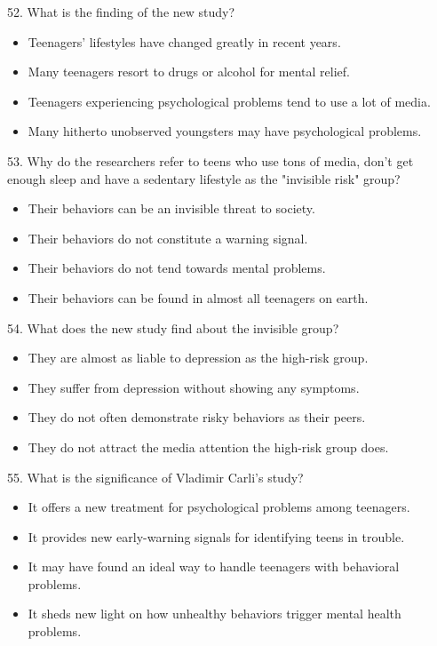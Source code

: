 \documentclass[UTF8,11pt]{ctexart}
\begin{document}
52. What is the finding of the new study?


\begin{itemize}[leftmargin=2em,itemsep=.2em,topsep=.4em]\item[A.] Teenagers' lifestyles have changed greatly in recent years.
\item[B.] Many teenagers resort to drugs or alcohol for mental relief.
\item[C.] Teenagers experiencing psychological problems tend to use a lot of media.
\item[D.] Many hitherto unobserved youngsters may have psychological problems.
\end{itemize}

53. Why do the researchers refer to teens who use tons of media, don't get enough sleep and have a sedentary lifestyle as the "invisible risk" group?


\begin{itemize}[leftmargin=2em,itemsep=.2em,topsep=.4em]\item[A.] Their behaviors can be an invisible threat to society.
\item[B.] Their behaviors do not constitute a warning signal.
\item[C.] Their behaviors do not tend towards mental problems.
\item[D.] Their behaviors can be found in almost all teenagers on earth.
\end{itemize}

54. What does the new study find about the invisible group?


\begin{itemize}[leftmargin=2em,itemsep=.2em,topsep=.4em]\item[A.] They are almost as liable to depression as the high-risk group.
\item[B.] They suffer from depression without showing any symptoms.
\item[C.] They do not often demonstrate risky behaviors as their peers.
\item[D.] They do not attract the media attention the high-risk group does.
\end{itemize}

55. What is the significance of Vladimir Carli's study?


\begin{itemize}[leftmargin=2em,itemsep=.2em,topsep=.4em]\item[A.] It offers a new treatment for psychological problems among teenagers.
\item[B.] It provides new early-warning signals for identifying teens in trouble.
\item[C.] It may have found an ideal way to handle teenagers with behavioral problems.
\item[D.] It sheds new light on how unhealthy behaviors trigger mental health problems.
\end{itemize}
\end{document}
